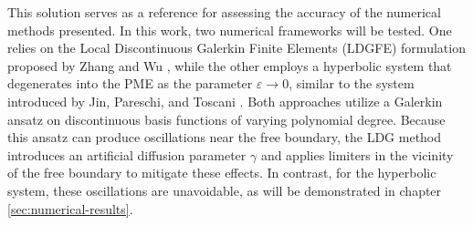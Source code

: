 \documentclass[a4paper,12pt]{paper}
\begin{document}
This solution serves as a reference for assessing the accuracy of the numerical methods presented. In this work, two numerical frameworks will be tested. One relies on the Local Discontinuous Galerkin Finite Elements (LDGFE) formulation proposed by Zhang and Wu \cite{Zhang2009}, while the other employs a hyperbolic system that degenerates into the PME as the parameter \(\varepsilon \to 0\), similar to the system introduced by Jin, Pareschi, and Toscani \cite{Jin1998}. Both approaches utilize a Galerkin ansatz on discontinuous basis functions of varying polynomial degree. Because this ansatz can produce oscillations near the free boundary, the LDG method introduces an artificial diffusion parameter \(\gamma\) and applies limiters in the vicinity of the free boundary to mitigate these effects. In contrast, for the hyperbolic system, these oscillations are unavoidable, as will be demonstrated in chapter \ref{sec:numerical-results}. 


\end{document}
